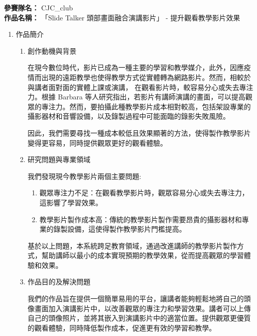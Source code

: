 \documentclass[12pt]{article}
\begin{document}
\date{}
\usetikzlibrary{automata, positioning, arrows}
{}

\noindent
\textbf{參賽隊名：} CJC\_club \\
\textbf{作品名稱：} 「Slide Talker 頭部畫面融合演講影片」 - 提升觀看教學影片效果

\begin{enumerate}
  \item 作品簡介
    \begin{enumerate}[label=\Alph*.]
      \setlength{\parindent}{2em}
      \item 創作動機與背景
        \par 在現今數位時代，影片已成為一種主要的學習和教學媒介，此外，因應疫情而出現的遠距教學也使得教學方式從實體轉為網路影片。然而，相較於與講者面對面的實體上課或演講，
        在觀看影片時，較容易分心或失去專注力。根據 Barbara 等人研究\cite{ref}指出，若影片有講師演講的畫面，可以提高觀眾的專注力。然而，要拍攝此種教學影片成本相對較高，包括架設專業的攝影器材和音響設備，以及錄製過程中可能面臨的錄影失敗風險。
        \par 因此，我們需要尋找一種成本較低且效果顯著的方法，使得製作教學影片變得更容易，同時提供觀眾更好的觀看體驗。
      \item 研究問題與專業領域
        \par 我們發現現今教學影片兩個主要問題:
        \begin{enumerate}[label=(\arabic*)]
          \item 觀眾專注力不足：在觀看教學影片時，觀眾容易分心或失去專注力，這影響了學習效果。
          \item 教學影片製作成本高：傳統的教學影片製作需要昂貴的攝影器材和專業的錄製設備，這使得製作教學影片門檻提高。
        \end{enumerate}
        \par 基於以上問題，本系統跨足教育領域，通過改進講師的教學影片製作方式，幫助講師以最小的成本實現預期的教學效果，從而提高觀眾的學習體驗和效果。
      \item 作品目的及解決問題
        \par 我們的作品旨在提供一個簡單易用的平台，讓講者能夠輕鬆地將自己的頭像畫面加入演講影片中，以改善觀眾的專注力和學習效果。講者可以上傳自己的頭像照片，並將其嵌入到演講影片中的適當位置。提供觀眾更優質的觀看體驗，同時降低製作成本，促進更有效的學習和教學。

\end{enumerate}
\end{enumerate}
\end{document}
